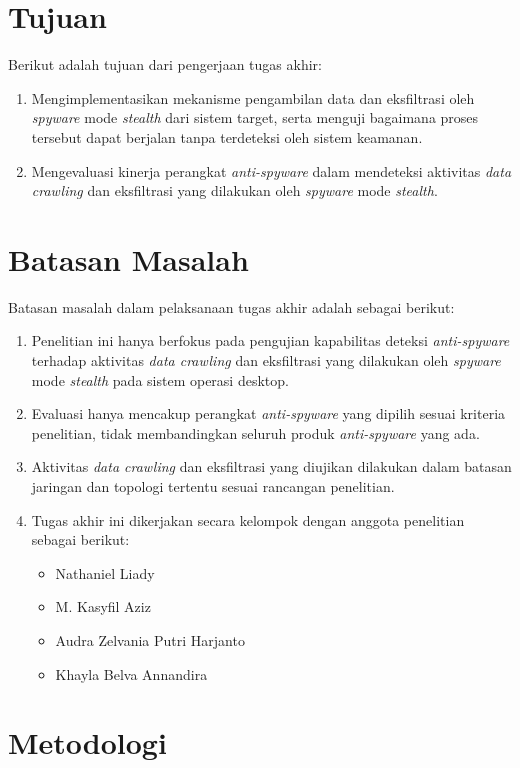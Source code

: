 \section{Tujuan}
Berikut adalah tujuan dari pengerjaan tugas akhir: 
\begin{enumerate}
\item	Mengimplementasikan mekanisme pengambilan data dan eksfiltrasi oleh \textit{spyware} mode \textit{stealth} dari sistem target, serta menguji bagaimana proses tersebut dapat berjalan tanpa terdeteksi oleh sistem keamanan.
\item   Mengevaluasi kinerja perangkat \textit{anti-spyware} dalam mendeteksi aktivitas \textit{data crawling} dan eksfiltrasi yang dilakukan oleh \textit{spyware} mode \textit{stealth}.
\end{enumerate}

\section{Batasan Masalah}
Batasan masalah dalam pelaksanaan tugas akhir adalah sebagai berikut: 
\begin{enumerate}
\item   Penelitian ini hanya berfokus pada pengujian kapabilitas deteksi \textit{anti-spyware} terhadap aktivitas \textit{data crawling} dan eksfiltrasi yang dilakukan oleh \textit{spyware} mode \textit{stealth} pada sistem operasi desktop.
\item   Evaluasi hanya mencakup perangkat \textit{anti-spyware} yang dipilih sesuai kriteria penelitian, tidak membandingkan seluruh produk \textit{anti-spyware} yang ada.
\item   Aktivitas \textit{data crawling} dan eksfiltrasi yang diujikan dilakukan dalam batasan jaringan dan topologi tertentu sesuai rancangan penelitian.
\item   Tugas akhir ini dikerjakan secara kelompok dengan anggota penelitian sebagai berikut:
  \begin{itemize}
      \item Nathaniel Liady
      \item M. Kasyfil Aziz
      \item Audra Zelvania Putri Harjanto
      \item Khayla Belva Annandira
  \end{itemize}
\end{enumerate}

\section{Metodologi}

